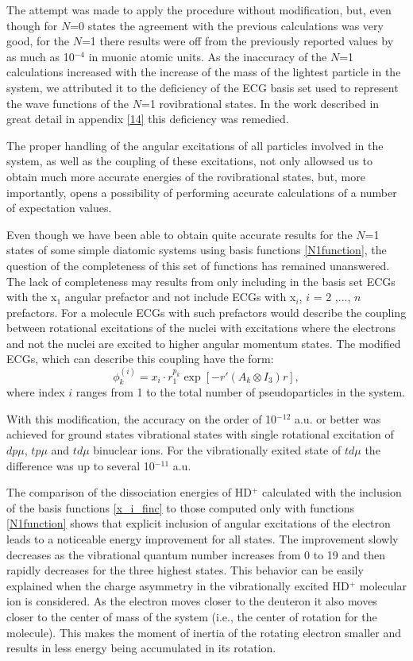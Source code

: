 The attempt was  made to apply the procedure without modification, but, even though 
for $N$=0 states the agreement with the previous calculations was very good, 
for the $N$=1 there results were off from the previously reported values by 
as much as 10$^{−4}$ in muonic atomic units.
As the inaccuracy of the $N$=1 calculations increased with the increase of the 
mass of the lightest particle in the system, we attributed it to the deficiency 
of the ECG basis set used to represent the wave functions of the $N$=1 
rovibrational states. In the work described in great detail in appendix \ref{14} 
this deficiency was remedied.

The proper handling of the angular excitations of all particles involved in the 
system, as well as the coupling of these excitations, not only allowsed us to obtain 
much more accurate energies of the rovibrational states, but, more importantly,
opens a possibility of performing accurate calculations of a number of expectation 
values.

Even though we have been able to obtain quite accurate results for the $N$=1 states 
of some simple diatomic systems using basis functions \ref{N1function}, the question 
of the completeness of this set of functions has remained unanswered. The lack of 
completeness may results from only including in the basis set ECGs with the x$_1$ 
angular prefactor and not include ECGs with x$_i$, $i$ = 2 ,$...$, $n$ prefactors. 
For a molecule ECGs with such prefactors would describe the coupling between rotational 
excitations of the nuclei with excitations where the electrons and not the nuclei 
are excited to higher angular momentum states. The modified ECGs, which can describe 
this coupling have the form:
\begin{equation}
\phi_k^{(i)} = x_i \cdot r_1^{p_k} \exp [-r'(A_k \otimes I_3) r],
\label{x_i_finc}
\end{equation}
where index $i$ ranges from 1 to the total number of pseudoparticles in the system.

With this modification, the accuracy on the order of 10$^{-12}$ a.u. or better was achieved
for ground states vibrational states with single rotational excitation of 
$dp\mu$, $tp\mu$ and $td\mu$ binuclear ions. For the vibrationally exited state 
of $td\mu$ the difference was up to several 10$^{-11}$ a.u.

The comparison of the dissociation energies of HD$^+$ calculated with the
inclusion of the basis functions \ref{x_i_finc} to those computed only with 
functions \ref{N1function} shows that explicit inclusion of angular excitations 
of the electron leads to a noticeable energy improvement for all states.
The improvement slowly decreases as the vibrational quantum number increases 
from 0 to 19 and then rapidly decreases for the three highest states. 
This behavior can be easily explained when the charge asymmetry in the 
vibrationally excited HD$^+$ molecular ion is considered.
As the electron moves closer to the deuteron it also moves closer to the 
center of mass of the system (i.e., the center of rotation for the molecule). 
This makes the moment of inertia of the rotating electron smaller and results 
in less energy being accumulated in its rotation.

